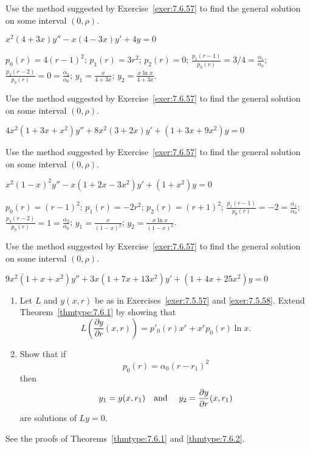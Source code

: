 \documentclass{ximera}
\begin{document}
\begin{problem}\label{exer:7.6.62}
Use the method
suggested by Exercise~\ref{exer:7.6.57} to find the general solution on
some interval $(0,\rho)$.

$x^2(4+3x)y''-x(4-3x)y'+4y=0$

\begin{solution}
    $p_0(r)=4(r-1)^2$;
$p_1(r)=3r^2$;
$p_2(r)=0$;
$\frac{p_1(r-1)}{ p_0(r)}=3/4=\frac{\alpha_1}{\alpha_0}$;
$\frac{p_2(r-2)}{ p_0(r)}=0=\frac{\alpha_2}{\alpha_0}$;
$y_1=\frac{x}{4+3x}$; $y_2=\frac{x\ln x}{4+3x}$.
\end{solution}
\end{problem}

\begin{problem}\label{exer:7.6.63}
Use the method
suggested by Exercise~\ref{exer:7.6.57} to find the general solution on
some interval $(0,\rho)$.

$4x^2(1+3x+x^2)y''+8x^2(3+2x)y'+(1+3x+9x^2)y=0$
\end{problem}

\begin{problem}\label{exer:7.6.64}
Use the method
suggested by Exercise~\ref{exer:7.6.57} to find the general solution on
some interval $(0,\rho)$.

$x^2(1-x)^2y''-x(1+2x-3x^2)y'+(1+x^2)y=0$

\begin{solution}
    $p_0(r)=(r-1)^2$;
$p_1(r)=-2r^2$;
$p_2(r)=(r+1)^2$;
$\frac{p_1(r-1)}{ p_0(r)}=-2=\frac{\alpha_1}{\alpha_0}$;
$\frac{p_2(r-2)}{ p_0(r)}=1=\frac{\alpha_2}{\alpha_0}$;
$y_1=\frac{x}{(1-x)^2}$; $y_2=\frac{x\ln x}{(1-x)^2}$.

\end{solution}
\end{problem}

\begin{problem}\label{exer:7.6.65}
Use the method
suggested by Exercise~\ref{exer:7.6.57} to find the general solution on
some interval $(0,\rho)$.

$9x^2(1+x+x^2)y''+3x(1+7x+13x^2)y'+(1+4x+25x^2)y=0$
\end{problem}

\begin{problem}\label{exer:7.6.66}
\begin{enumerate}
\item %
Let $L$ and $y(x,r)$ be as in Exercises~\ref{exer:7.5.57} and
\ref{exer:7.5.58}. Extend Theorem~\ref{thmtype:7.6.1} by showing that
$$
L\left(\frac{\partial y}{ \partial
r}(x,r)\right)=p'_0(r)x^r+x^rp_0(r)\ln x.
$$
\item %
Show that if
$$
p_0(r)=\alpha_0(r-r_1)^2
$$
then
$$
y_1=y(x,r_1) \mbox{\quad and \quad} y_2=\frac{\partial
y}{\partial r}(x,r_1)
$$
 are solutions of $Ly=0$.
\end{enumerate}
\begin{solution}
    See the proofs of Theorems~\ref{thmtype:7.6.1} and \ref{thmtype:7.6.2}.
\end{solution}
\end{problem}
\end{document}
